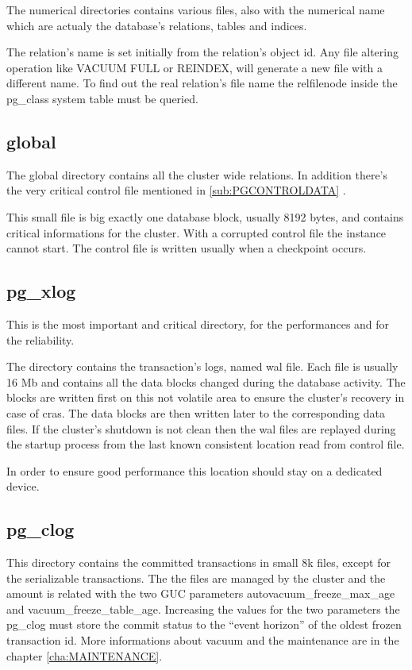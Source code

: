 The numerical directories contains various files, also with the numerical name 
which are actualy the database's relations, tables and indices. 

The relation's name is set initially from the relation's object id. Any file 
altering operation like VACUUM FULL or REINDEX, will generate a new file 
with a different name. To find out the real relation's file name the 
relfilenode inside the pg\_class system table  must be queried.

\subsection{global}
The global directory contains all the cluster wide relations.
In addition there's the very critical  control file mentioned in 
\ref{sub:PGCONTROLDATA} .

This small file is big exactly one database block, usually 8192 bytes, and 
contains critical informations for the cluster. 
With a corrupted control file the instance cannot start. 
The control file is written usually when a checkpoint occurs.

\subsection{pg\_xlog}
This is the most important and critical directory, for the performances and for 
the reliability. 

The directory contains the transaction's logs,  named wal 
file. Each file is usually 16 Mb and contains all the data blocks changed during 
the database activity. 
The blocks are written first on this not volatile area to ensure the cluster's 
recovery in case of cras. The data blocks are then written later to the 
corresponding data files. If the cluster's shutdown is not clean then the wal 
files are replayed during the startup process from the last known consistent 
location read from control file.

In order to ensure good performance this location should stay on a dedicated 
device. 

\subsection{pg\_clog}
This directory contains the committed transactions in small 8k files, except 
for the serializable transactions.
The the files are managed by the cluster and the amount is related with 
the two GUC parameters autovacuum\_freeze\_max\_age and 
vacuum\_freeze\_table\_age.
Increasing the values for the two parameters the pg\_clog must store the commit 
status to the ``event horizon'' of the oldest frozen transaction id. 
More informations about vacuum and the maintenance are in 
the chapter \ref{cha:MAINTENANCE}.

